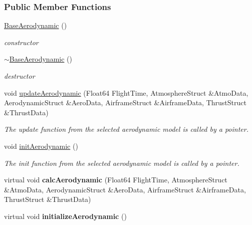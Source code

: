 \subsubsection*{Public Member Functions}
\begin{DoxyCompactItemize}
\item 
\mbox{\label{group___aerodynamic_aa05d0598119b1364cdb45cf478ae578c}} 
\hyperlink{group___aerodynamic_aa05d0598119b1364cdb45cf478ae578c}{Base\+Aerodynamic} ()
\begin{DoxyCompactList}\small\item\em constructor \end{DoxyCompactList}\item 
\mbox{\label{group___aerodynamic_a81d08f3a779e6e25245b6f3b545920cb}} 
\hyperlink{group___aerodynamic_a81d08f3a779e6e25245b6f3b545920cb}{$\sim$\+Base\+Aerodynamic} ()
\begin{DoxyCompactList}\small\item\em destructor \end{DoxyCompactList}\item 
\mbox{\label{group___aerodynamic_a6354f3c8433c7a2235041f843d4fe10e}} 
void \hyperlink{group___aerodynamic_a6354f3c8433c7a2235041f843d4fe10e}{update\+Aerodynamic} (Float64 Flight\+Time, Atmosphere\+Struct \&Atmo\+Data, Aerodynamic\+Struct \&Aero\+Data, Airframe\+Struct \&Airframe\+Data, Thrust\+Struct \&Thrust\+Data)
\begin{DoxyCompactList}\small\item\em The update function from the selected aerodynamic model is called by a pointer. \end{DoxyCompactList}\item 
\mbox{\label{group___aerodynamic_aaeebe11ae40e87069a13256d1de4f1bb}} 
void \hyperlink{group___aerodynamic_aaeebe11ae40e87069a13256d1de4f1bb}{init\+Aerodynamic} ()
\begin{DoxyCompactList}\small\item\em The init function from the selected aerodynamic model is called by a pointer. \end{DoxyCompactList}\item 
\mbox{\label{group___aerodynamic_a2a2d641c761198459eba1719d6ea78e9}} 
virtual void {\bfseries calc\+Aerodynamic} (Float64 Flight\+Time, Atmosphere\+Struct \&Atmo\+Data, Aerodynamic\+Struct \&Aero\+Data, Airframe\+Struct \&Airframe\+Data, Thrust\+Struct \&Thrust\+Data)
\item 
\mbox{\label{group___aerodynamic_a3f141372283dab543e7f26359daa0310}} 
virtual void {\bfseries initialize\+Aerodynamic} ()
\end{DoxyCompactItemize}
\label{class_d_a_t_c_o_m_aerodymamic}
